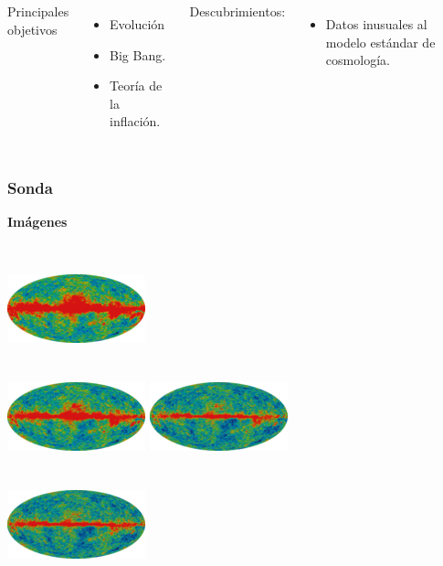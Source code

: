 \documentclass[UKenglish]{beamer}
\begin{document}
{\begin{frame}
\begin{columns}
    Principales objetivos
    \begin{itemize}
        \item Evolución
        \item Big Bang. 
        \item Teoría de la inflación.
    \end{itemize}
Descubrimientos: 
    \begin{itemize}
        \item Datos inusuales al modelo estándar de cosmología. 
    \end{itemize}
    \end{columns}

\end{frame}

\begin{frame}
\frametitle{Sonda}{\textbf{Imágenes}}
\begin{columns}[t]
\centering
\includegraphics[width=4cm,height=3cm]{1.png}\\
\includegraphics[width=4cm,height=3cm]{2.png}
\centering
\includegraphics[width=4cm,height=3cm]{3.png}\\
\includegraphics[width=4cm,height=3cm]{4.png}
\end{columns}
 

\end{frame}}
\end{document}
